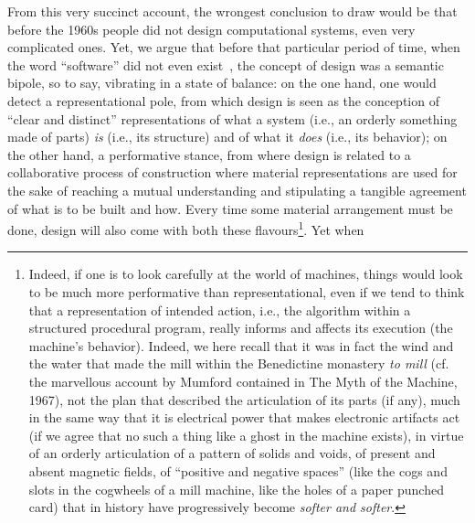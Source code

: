 \documentclass{article}
\begin{document}
From this very succinct account, the wrongest conclusion to draw would be that before the 1960s people did not design computational systems, even very complicated ones. Yet, we argue that before that particular period of time, when the word ``software'' did not even exist~\citep{haigh_software_2002}, the concept of design was a semantic bipole, so to say, vibrating in a state of balance: on the one hand, one would detect a representational pole, from which design is seen as the conception of ``clear and distinct'' representations of what a system (i.e., an orderly something made of parts) \emph{is} (i.e., its structure) and of what it \emph{does} (i.e., its behavior); on the other hand, a performative stance, from where design is related to a collaborative process of construction where material representations are used for the sake of reaching a mutual understanding and stipulating a tangible agreement of what is to be built and how. Every time some material arrangement must be done, design will also come with both these flavours\footnote{Indeed, if one is to look carefully at the world of machines, things would look to be much more performative than representational, even if we tend to think that a representation of intended action, i.e., the algorithm within a structured procedural program, really informs and affects its execution (the machine's behavior). Indeed, we here recall that it was in fact the wind and the water that made the mill within the Benedictine monastery \emph{to mill} (cf. the marvellous account by Mumford contained in The Myth of the Machine, 1967), not the plan that described the articulation of its parts (if any), much in the same way that it is electrical power that makes electronic artifacts act (if we agree that no such a thing like a ghost in the machine exists), in virtue of an orderly articulation of a pattern of solids and voids, of present and absent magnetic fields, of ``positive and negative spaces'' (like the cogs and slots in the cogwheels of a mill machine, like the holes of a paper punched card) that in history have progressively become \emph{softer and softer}.}. Yet when 
\end{document}
